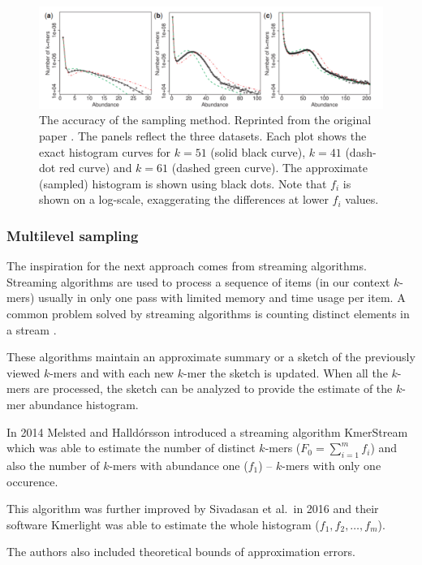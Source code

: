 \begin{figure}
\centerline{\includegraphics[width=1.1\textwidth]{images/kmergenie-sampling-accuracy.pdf}}
\caption[Accuracy of KmerGenie Sampling]{The accuracy of the sampling method. Reprinted from the original paper \cite{Chikhi2013}. 
The panels reflect the three datasets. Each plot shows the exact
histogram curves for $k=51$ (solid black curve), $k=41$ (dash-dot red curve) and $k=61$ (dashed green curve). The approximate (sampled) histogram is
shown using black dots. Note that $f_i$ is shown on a log-scale, exaggerating the differences at lower $f_i$ values.}
\label{img:kmergenie-sampling-accuracy}
\end{figure}

\subsubsection{Multilevel sampling}
The inspiration for the next approach comes from streaming algorithms.
Streaming algorithms are used to process a sequence of items (in our context $k$-mers) usually 
in only one pass with limited memory and time usage per item. A common problem solved by
streaming algorithms is counting distinct elements in a stream \cite{WikiStreamingAlg}.

These algorithms maintain an approximate summary or a sketch of the previously viewed
$k$-mers and with each new $k$-mer the sketch is updated. When all the $k$-mers are processed,
the sketch can be analyzed to provide the estimate of the $k$-mer abundance histogram.

\medskip

In 2014 Melsted and Halldórsson introduced a streaming algorithm KmerStream \cite{Melsted2014}
which was able to estimate the number of distinct $k$-mers ($F_0 = \sum_{i=1}^{m} f_i$) and also
the number of $k$-mers with abundance one ($f_1$) -- $k$-mers with only one occurence.

This algorithm was further improved by Sivadasan et al.\ in 2016 \cite{Sivadasan2016} and their software 
Kmerlight was able to estimate the whole histogram ($f_1, f_2, \dots , f_m$). 

The authors also included theoretical bounds of approximation errors.
